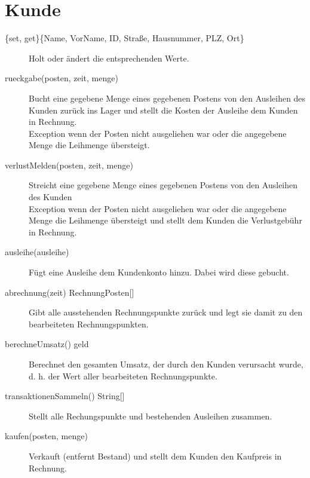 \documentclass[a4paper,12pt,titlepage]{article}
\begin{document}
\section{Kunde}
\begin{description}
\item[\{set, get\}\{Name, VorName, ID, Straße, Hausnummer, PLZ, Ort\}]
Holt oder ändert die entsprechenden Werte.
\item[rueckgabe(posten, zeit, menge)]
Bucht eine gegebene Menge eines gegebenen Postens von den Ausleihen des Kunden zurück ins Lager
und stellt die Kosten der Ausleihe dem Kunden in Rechnung.\\
Exception wenn der Posten nicht ausgeliehen war oder die angegebene Menge die Leihmenge übersteigt.
\item[verlustMelden(posten, zeit, menge)]
Streicht eine gegebene Menge eines gegebenen Postens von den Ausleihen des Kunden\\
Exception wenn der Posten nicht ausgeliehen war oder die angegebene Menge die Leihmenge übersteigt
und stellt dem Kunden die Verlustgebühr in Rechnung.
\item[ausleihe(ausleihe)]
Fügt eine Ausleihe dem Kundenkonto hinzu. Dabei wird diese gebucht.
\item[abrechnung(zeit) \rightarrow RechnungPosten{[]}]
Gibt alle ausstehenden Rechnungspunkte zurück und legt sie damit zu den bearbeiteten Rechnungspunkten.
\item[berechneUmsatz() \rightarrow geld]
Berechnet den gesamten Umsatz, der durch den Kunden verursacht wurde, d. h. der Wert aller bearbeiteten Rechnungspunkte.
\item[transaktionenSammeln() \rightarrow String{[]}]
Stellt alle Rechungspunkte und bestehenden Ausleihen zusammen.
\item[kaufen(posten, menge)]
Verkauft (entfernt Bestand) und stellt dem Kunden den Kaufpreis in Rechnung.
\end{description}
\end{document}
